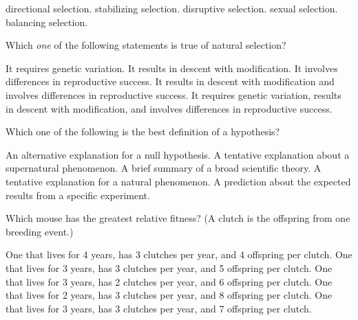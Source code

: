 \begin{choices}
	\correctchoice directional selection. %
	\choice stabilizing selection. %
	\choice disruptive selection. %
	\choice sexual selection. %
	\choice balancing selection. %
\end{choices}



\question
Which \emph{one} of the following statements is true of natural selection?

\begin{choices}
\choice It requires genetic variation. %
\choice It results in descent with modification. %
\choice It involves differences in reproductive success. %
\choice It results in descent with modification and involves differences in reproductive success. %
\correctchoice It requires genetic variation, results in descent with modification, and involves differences in reproductive success. %
\end{choices}


\question
Which one of the following is the best definition of a hypothesis?

\begin{choices}
\choice An alternative explanation for a null hypothesis.%
\choice A tentative explanation about a supernatural phenomenon.%
\choice A brief summary of a broad scientific theory.%
\correctchoice A tentative explanation for a natural phenomenon.%
\choice A prediction about the expected results from a specific experiment.%
\end{choices}

\question
Which mouse has the greatest relative fitness? (A clutch is the offspring from one breeding event.)

\begin{choices}
\choice One that lives for 4 years, has 3 clutches per year, and 4 offspring per clutch.%
\choice One that lives for 3 years, has 3 clutches per year, and 5 offspring per clutch.%
\choice One that lives for 3 years, has 2 clutches per year, and 6 offspring per clutch. %
\choice One that lives for 2 years, has 3 clutches per year, and 8 offspring per clutch. %
\correctchoice One that lives for 3 years, has 3 clutches per year, and 7 offspring per clutch. %
\end{choices}


